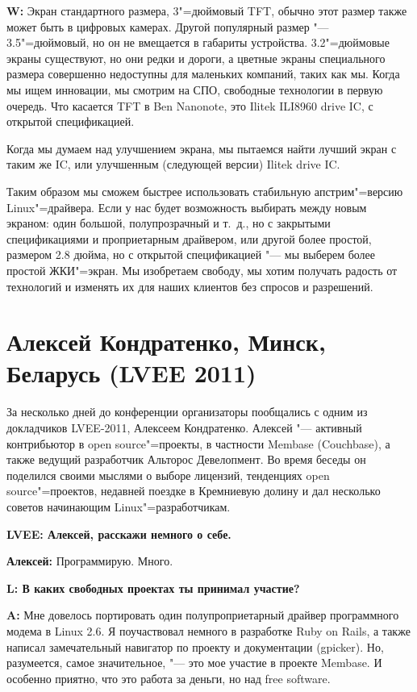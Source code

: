 \documentclass[10pt, a5paper]{article}
\begin{document}
{\noindent \bf W:} Экран стандартного размера, 3"=дюймовый TFT, обычно этот размер также может быть в цифровых камерах. Другой популярный размер "--- 3.5"=дюймовый, но он не вмещается в габариты устройства. 3.2"=дюймовые экраны существуют, но они редки и дороги, а цветные экраны специального размера совершенно недоступны для маленьких компаний, таких как мы. Когда мы ищем инновации, мы смотрим на СПО, свободные технологии в первую очередь. Что касается TFT в Ben Nanonote, это Ilitek ILI8960 drive IC, с открытой спецификацией.

Когда мы думаем над улучшением экрана, мы пытаемся найти лучший экран с таким же IC, или улучшенным (следующей версии) Ilitek drive IC.

Таким образом мы сможем быстрее использовать стабильную апстрим"=версию Linux"=драйвера. Если у нас будет возможность выбирать между новым экраном: один большой, полупрозрачный и т.~д., но с закрытыми спецификациями и проприетарным драйвером, или другой более простой, размером 2.8 дюйма, но с открытой спецификацией "--- мы выберем более простой ЖКИ"=экран. Мы изобретаем свободу, мы хотим получать радость от технологий и изменять их для наших клиентов без спросов и разрешений.

\section{Алексей Кондратенко, Минск, Беларусь (LVEE 2011)}


За несколько дней до конференции организаторы пообщались с одним из докладчиков LVEE-2011, Алексеем Кондратенко. Алексей "--- активный контрибьютор в open source"=проекты, в частности Membase (Couchbase), а также ведущий разработчик Альторос Девелопмент. Во время беседы он поделился своими мыслями о выборе лицензий, тенденциях open source"=проектов, недавней поездке в Кремниевую долину и дал несколько советов начинающим Linux"=разработчикам.

{\noindent \bf LVEE: Алексей, расскажи немного о себе.}

{\noindent \bf Алексей:} Программирую. Много.

{\noindent \bf L:  В каких свободных проектах ты принимал участие?}

{\noindent \bf A:} Мне довелось портировать один полупроприетарный драйвер программного модема в Linux 2.6. Я поучаствовал немного в разработке Ruby on Rails, а также написал замечательный навигатор по проекту и документации (gpicker). Но, разумеется, самое значительное, "--- это  мое участие в проекте Membase. И особенно приятно, что это работа за деньги, но над free software.
\end{document}
